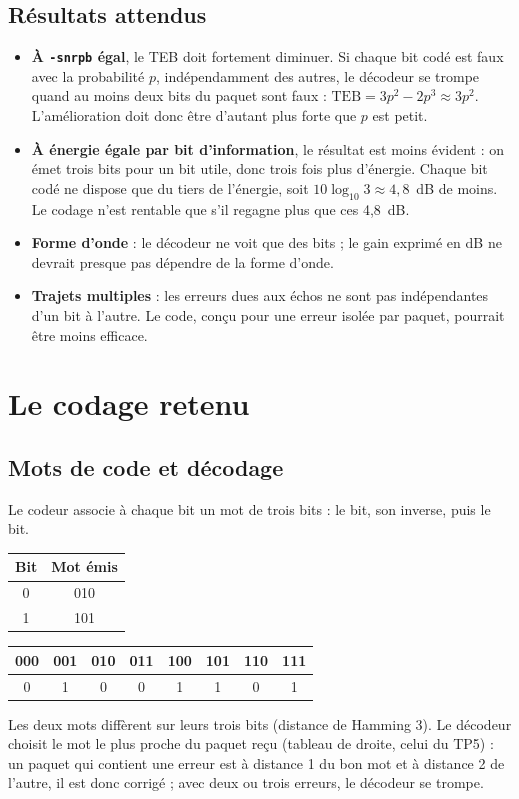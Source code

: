 \documentclass[11pt,a4paper]{article}
\begin{document}
\subsection{Résultats attendus}
\begin{itemize}
  \item \textbf{À \texttt{-snrpb} égal}, le TEB doit fortement diminuer. Si chaque bit codé est faux avec la probabilité $p$, indépendamment des autres, le décodeur se trompe quand au moins deux bits du paquet sont faux : $\text{TEB} = 3p^2 - 2p^3 \approx 3p^2$. L'amélioration doit donc être d'autant plus forte que $p$ est petit.
  \item \textbf{À énergie égale par bit d'information}, le résultat est moins évident : on émet trois bits pour un bit utile, donc trois fois plus d'énergie. Chaque bit codé ne dispose que du tiers de l'énergie, soit $10\log_{10}3 \approx 4{,}8$~dB de moins. Le codage n'est rentable que s'il regagne plus que ces 4,8~dB.
  \item \textbf{Forme d'onde} : le décodeur ne voit que des bits ; le gain exprimé en dB ne devrait presque pas dépendre de la forme d'onde.
  \item \textbf{Trajets multiples} : les erreurs dues aux échos ne sont pas indépendantes d'un bit à l'autre. Le code, conçu pour une erreur isolée par paquet, pourrait être moins efficace.
\end{itemize}

\section{Le codage retenu}
\subsection{Mots de code et décodage}
Le codeur associe à chaque bit un mot de trois bits : le bit, son inverse, puis le bit.
\begin{center}\begin{tabular}{cc}\toprule Bit & Mot émis\\\midrule 0 & 010\\ 1 & 101\\\bottomrule\end{tabular}
\qquad
\begin{tabular}{cccccccc}\toprule
000 & 001 & 010 & 011 & 100 & 101 & 110 & 111\\\midrule
0 & 1 & 0 & 0 & 1 & 1 & 0 & 1\\\bottomrule
\end{tabular}\end{center}
Les deux mots diffèrent sur leurs trois bits (distance de Hamming 3). Le décodeur choisit le mot le plus proche du paquet reçu (tableau de droite, celui du TP5) : un paquet qui contient une erreur est à distance 1 du bon mot et à distance 2 de l'autre, il est donc corrigé ; avec deux ou trois erreurs, le décodeur se trompe.
\end{document}
